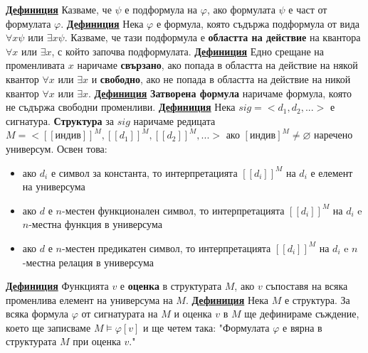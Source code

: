 \documentclass{article}
\begin{document}
\textbf{\underline{Дефиниция}}
Казваме, че $\psi$ е подформула на $\varphi$, ако формулата $\psi$ е част от формулата $\varphi$. \newline\newline
\textbf{\underline{Дефиниция}}
Нека $\varphi$ е формула, която съдържа подформула от вида $\forall x\psi$ или $\exists x\psi$. Казваме, че тази подформула е \textbf{областта на действие}
на квантора $\forall x$ или $\exists x$, с който започва подформулата. \newline\newline
\textbf{\underline{Дефиниция}}
Едно срещане на променливата $x$ наричаме \textbf{свързано}, ако попада в областта на действие на някой квантор $\forall x$ или $\exists x$ и
\textbf{свободно}, ако не попада в областта на действие на никой квантор $\forall x$ или $\exists x$. \newline\newline
\textbf{\underline{Дефиниция}}
\textbf{Затворена формула} наричаме формула, която не съдържа свободни променливи. \newline\newline
\textbf{\underline{Дефиниция}}
Нека $sig = <d_1, d_2, ...>$ е сигнатура. \textbf{Структура} за $sig$ наричаме редицата $M = <[[\text{индив}]]^M, [[d_1]]^M, [[d_2]]^M, ...>$
ако $[\text{индив}]^M \neq \varnothing$ наречено универсум. Освен това:
\begin{itemize}
    \item ако $d_i$ е символ за константа, то интерпретацията $[[d_i]]^M$ на $d_i$ е елемент на универсума
    \item ако $d$ е $n$-местен функционален символ, то интерпретацията $[[d_i]]^M$ на $d_i$ e $n$-местна функция в универсума
    \item ако $d$ е $n$-местен предикатен символ, то интерпретацията $[[d_i]]^M$ на $d_i$ e $n$-местна релация в универсума
\end{itemize}
\textbf{\underline{Дефиниция}}
Функцията $v$ е \textbf{оценка} в структурата $M$, ако $v$ съпоставя на всяка променлива елемент на универсума на $M$. \newline\newline
\textbf{\underline{Дефиниция}}
Нека $M$ е структура. За всяка формула $\varphi$ от сигнатурата на $M$ и оценка $v$ в $M$ ще дефинираме съждение, което ще записваме
$M \vDash \varphi[v]$ и ще четем така: "Формулата $\varphi$ е вярна в структурата $M$ при оценка $v$." \newline\newline
\end{document}
